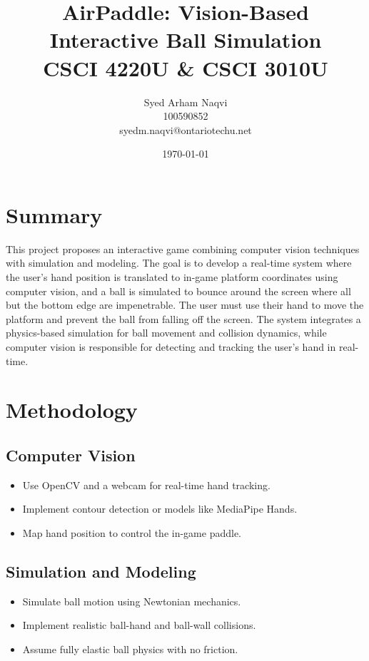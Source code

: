 \documentclass{article}
\title{\textbf{AirPaddle: Vision-Based Interactive Ball Simulation}\\ \LARGE{CSCI 4220U \& CSCI 3010U}}
\author{Syed Arham Naqvi \\ 100590852 \\ syedm.naqvi@ontariotechu.net}
\date{\today}
\begin{document}
\maketitle

\section*{\Large{Summary}}
This project proposes an interactive game combining computer vision techniques with simulation and modeling. The goal is to develop a real-time system where the user's hand position is translated to
in-game platform coordinates using computer vision, and a ball is simulated to bounce around the screen where all but the bottom edge are impenetrable. The user must use their hand to move the platform and prevent the ball
from falling off the screen. The system integrates a physics-based simulation for ball movement and collision dynamics, while computer vision is responsible for detecting and tracking the user's hand in real-time.

\vspace*{5pt}

\section*{\Large{Methodology}}

\begin{center}
    \begin{minipage}[t]{0.48\textwidth}
        \subsection*{\large{Computer Vision}}
        \begin{itemize}
            \item Use OpenCV and a webcam for real-time hand tracking.
            \item Implement contour detection or models like MediaPipe Hands.
            \item Map hand position to control the in-game paddle.
        \end{itemize}
    \end{minipage}
    \begin{minipage}[t]{0.48\textwidth}
        \subsection*{\large{Simulation and Modeling}}
        \begin{itemize}
            \item Simulate ball motion using Newtonian mechanics.
            \item Implement realistic ball-hand and ball-wall collisions.
            \item Assume fully elastic ball physics with no friction.
        \end{itemize}
    \end{minipage}
\end{center}
\end{document}
